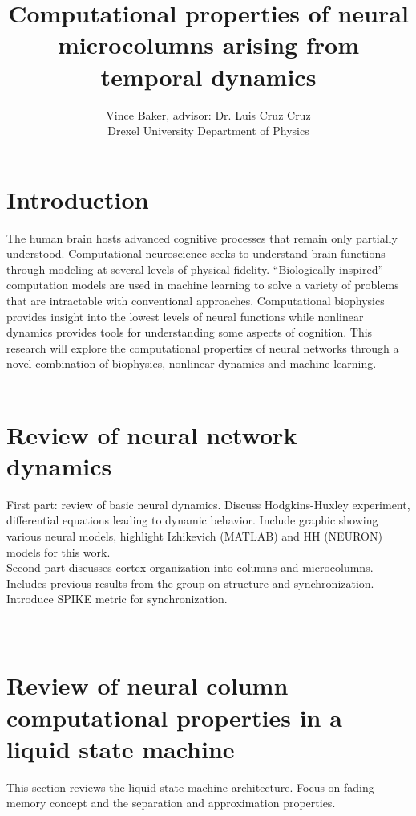 \documentclass[a4paper,11pt]{article}
\title{Computational properties of neural microcolumns arising from temporal dynamics}
\author{Vince Baker, advisor: Dr. Luis Cruz Cruz\\ Drexel University Department of Physics}
\numberwithin{equation}{section}
\begin{document}
\maketitle

\section{Introduction} 
The human brain hosts advanced cognitive processes that remain only partially understood.
Computational neuroscience seeks to understand brain functions through modeling at several levels of physical fidelity.
``Biologically inspired'' computation models are used in machine learning to solve a variety of problems that are intractable with conventional approaches.
Computational biophysics provides insight into the lowest levels of neural functions while nonlinear dynamics provides tools for understanding some aspects of cognition.
This research will explore the computational properties of neural networks through a novel combination of biophysics, nonlinear dynamics and machine learning.
\\ \\
\section{Review of neural network dynamics}
First part: review of basic neural dynamics.
Discuss Hodgkins-Huxley experiment, differential equations leading to dynamic behavior.
Include graphic showing various neural models, highlight Izhikevich (MATLAB) and HH (NEURON) models for this work.\\
Second part discusses cortex organization into columns and microcolumns.
Includes previous results from the group on structure and synchronization.
Introduce SPIKE metric for synchronization.\\
\\ \\
\section{Review of neural column computational properties in a liquid state machine}
This section reviews the liquid state machine architecture.
Focus on fading memory concept and the separation and approximation properties.\\
\\ \\
\end{document}
